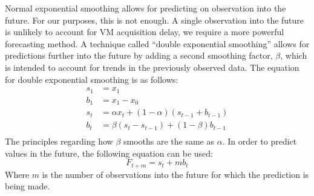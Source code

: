 Normal exponential smoothing allows for predicting on observation into the future. For our purposes, this is not enough. A single observation into the future is unlikely to account for VM acquisition delay, we require a more powerful forecasting method. A technique called ``double exponential smoothing'' \cite{statistics} allows for predictions further into the future by adding a second smoothing factor, $\beta$, which is intended to account for trends in the previously observed data. The equation for double exponential smoothing is as follows:
\begin{equation}
\begin{split}
s_1& = x_1\\
b_1& = x_1 - x_0\\
s_{t}& = \alpha x_{t} + (1-\alpha)(s_{t-1} + b_{t-1})\\
b_{t}& = \beta (s_t - s_{t-1}) + (1-\beta)b_{t-1}\\
\end{split}
\end{equation}
The principles regarding how $\beta$ smooths are the same as $\alpha$. In order to predict values in the future, the following equation can be used:
\begin{equation}
F_{t+m} = s_t + mb_t
\end{equation}
Where $m$ is the number of observations into the future for which the prediction is being made.





